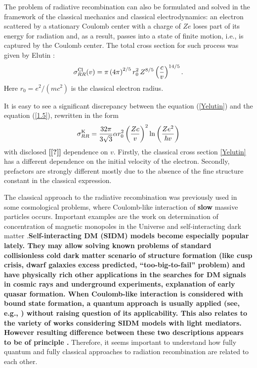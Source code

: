 \documentclass{SovJurn/JETPL}
\begin{document}
The problem of radiative recombination can also be formulated and solved in the framework of the classical mechanics and classical electrodynamics: an electron scattered by a stationary Coulomb center with a charge of $Ze$ loses part of its energy for radiation and, as a result, passes into a state of finite motion, i.e., is captured by the Coulomb center. The total cross section for such process was given by Elutin \cite{elutin}: 
\begin{equation}
\sigma^{\rm Cl}_{RR}(v)=\pi\left(4\pi\right)^{2/5}r^2_0\, Z^{8/5}\left(\frac{c}{v}\right)^{14/5}.
\label{Yelutin}
\end{equation}
Нere $r_0=e^2/(mc^2)$ is the classical electron radius.

It is easy to see a significant discrepancy between the equation (\ref{Yelutin}) and the equation (\ref{1.5}), rewritten in the form
\begin{equation}
\sigma^{\rm K}_{RR}=\frac{32\pi}{3\sqrt{3}}\alpha r^2_0\left(\frac{Zc}{v}\right)^2 \ln\left(\frac{Ze^2}{\hbar v}\right)
\label{Kramers_inegral}
\end{equation}
with disclosed  \textbf{[[?]]} dependence on $v$. Firstly, the classical cross section \eqref{Yelutin} has a different dependence on the initial velocity of the electron. Secondly, prefactors are strongly different mostly due to the absence of the fine structure constant in the classical expression. 

The classical approach to the radiative recombination was previously used in some cosmological problems, where %
Coulomb-like interaction of \textbf{slow} massive particles occurs. Important examples are the work on determination of concentration of magnetic monopoles in the Universe \cite{zeldovich1978concentration} and self-interacting dark matter \cite{Belotsky_2016, Belotsky:2005dk, Belotsky:2015fuc,Belotsky2017positron,Belotsky:2015rhp,Nazarova:2017xaw}.\textbf{Self-interacting DM (SIDM) models become especially popular lately. They may allow solving known problems of standard collisionless cold dark matter scenario of structure formation (like cusp crisis, dwarf galaxies excess predicted, ``too-big-to-fail'' problem) and have physically rich other applications in the searches for DM signals in cosmic rays and underground experiments, explanation of early quasar formation. When Coulomb-like interaction is considered with bound state formation, a quantum approach is usually applied (see, e.g., \cite{Cirelli2017,Petraki2017}) without raising question of its applicability. This also relates to the variety of works considering SIDM models with light mediators. However resulting difference between these two descriptions appears to be of principle \cite{Belotsky_2016}.} Therefore, it seems important to understand how fully quantum and fully classical approaches to radiation recombination are related to each other.
\end{document}
